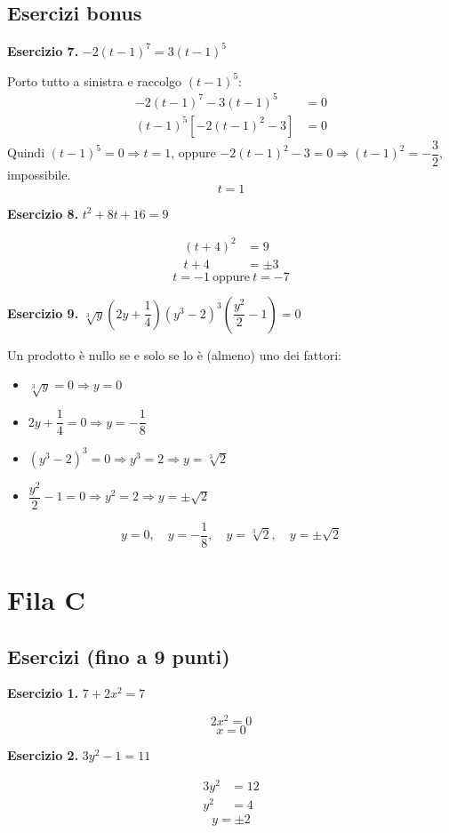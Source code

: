 \documentclass[11pt]{report}
\newcommand{\eserc}[1]{\bigskip\noindent\textbf{Esercizio #1.}\quad}
\begin{document}
\subsection*{Esercizi bonus}

\eserc{7} $-2(t-1)^7=3(t-1)^5$

Porto tutto a sinistra e raccolgo $(t-1)^5$:
\begin{align*}
-2(t-1)^7-3(t-1)^5 &=0\\
(t-1)^5\left[-2(t-1)^2-3\right] &=0
\end{align*}
Quindi $(t-1)^5=0 \Rightarrow t=1$, oppure $-2(t-1)^2-3=0 \Rightarrow (t-1)^2=-\dfrac32$, impossibile.
\[
\boxed{t=1}
\]

\eserc{8} $t^2+8t+16=9$

\begin{align*}
(t+4)^2 &= 9\\
t+4 &= \pm3
\end{align*}
\[
\boxed{t=-1 \ \text{oppure}\ t=-7}
\]

\eserc{9} $\sqrt[3] y\left(2y+\dfrac14\right)(y^3-2)^3\left(\dfrac {y^2}2 -1\right)=0$

Un prodotto è nullo se e solo se lo è (almeno) uno dei fattori:
\begin{itemize}
\item $\sqrt[3]{y}=0 \Rightarrow y=0$
\item $2y+\dfrac14=0 \Rightarrow y=-\dfrac18$
\item $(y^3-2)^3=0 \Rightarrow y^3=2 \Rightarrow y=\sqrt[3]2$
\item $\dfrac{y^2}2-1=0 \Rightarrow y^2=2 \Rightarrow y=\pm\sqrt2$
\end{itemize}
\[
\boxed{y=0,\quad y=-\dfrac18,\quad y=\sqrt[3]2,\quad y=\pm\sqrt2}
\]

\clearpage
\section*{Fila C}

\subsection*{Esercizi (fino a 9 punti)}

\eserc{1} $7+2x^2=7$

\[
2x^2=0
\]
\[
\boxed{x=0}
\]

\eserc{2} $3y^2-1=11$

\begin{align*}
3y^2 &= 12\\
y^2 &= 4
\end{align*}
\[
\boxed{y=\pm2}
\]
\end{document}
